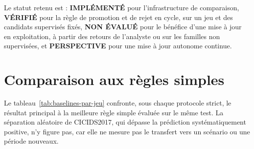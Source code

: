 Le statut retenu est : \textbf{IMPLÉMENTÉ} pour l’infrastructure de comparaison, \textbf{VÉRIFIÉ} pour la règle de promotion et de rejet en cycle, sur un jeu et des candidats supervisés fixés, \textbf{NON ÉVALUÉ} pour le bénéfice d'une mise à jour en exploitation, à partir des retours de l'analyste ou sur les familles non supervisées, et \textbf{PERSPECTIVE} pour une mise à jour autonome continue.

\section{Comparaison aux règles simples}
\label{sec:baselines-par-jeu}

Le tableau~\ref{tab:baselines-par-jeu} confronte, sous chaque protocole strict, le résultat principal à la meilleure règle simple évaluée sur le même test. La séparation aléatoire de CICIDS2017, qui dépasse la prédiction systématiquement positive, n'y figure pas, car elle ne mesure pas le transfert vers un scénario ou une période nouveaux.

